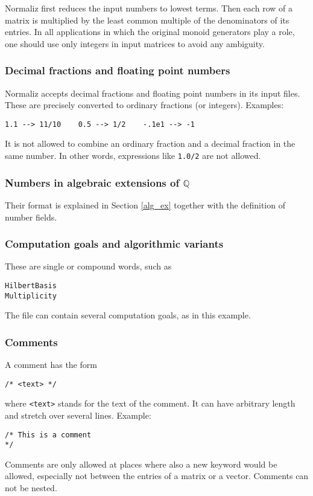 \documentclass[12pt,a4paper]{scrartcl}
\theoremstyle{definition}
\def\QQ{{\mathbb Q}}
\def\ttt{\texttt}
\begin{document}
Normaliz first reduces the input numbers to lowest terms. Then each row of a matrix is multiplied by the least common multiple of the denominators of its entries. In all applications in which the original monoid generators play a role, one should use only integers in input matrices to avoid any ambiguity.

\subsubsection{Decimal fractions and floating point numbers}\label{decimal_input}

Normaliz accepts decimal fractions and floating point numbers in its input files. These are precisely converted to ordinary fractions (or integers). Examples:
\begin{Verbatim}
1.1 --> 11/10    0.5 --> 1/2    -.1e1 --> -1
\end{Verbatim}
It is not allowed to combine an ordinary fraction and a decimal fraction in the same number. In other words, expressions like \verb|1.0/2| are not allowed.

\subsubsection{Numbers in algebraic extensions of $\QQ$}\label{numberfield_input}

Their format is explained in Section \ref{alg_ex} together with the definition of number fields.

\subsubsection{Computation goals and algorithmic variants}\label{subsecGoals}

These are single or compound words, such as
\begin{Verbatim}
HilbertBasis
Multiplicity
\end{Verbatim}
The file can contain several computation goals, as in this example.

\subsubsection{Comments}

A comment has the form
\begin{Verbatim}
/* <text> */
\end{Verbatim}
where \ttt{<text>} stands for the text of the comment. It can have arbitrary length and stretch over several lines. Example:
\begin{Verbatim}
/* This is a comment
*/
\end{Verbatim}
Comments are only allowed at places where also a new keyword would be allowed, especially not between the entries of a matrix or a vector. Comments can not be nested.
\end{document}
